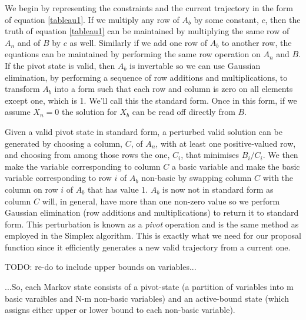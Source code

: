 \documentclass{article}
\begin{document}
We begin by representing the constraints and the current trajectory in the form of equation \ref{tableau1}. If we multiply any row of $A_b$ by some constant, $c$, then the truth of equation \ref{tableau1} can be maintained by multiplying the same row of $A_n$ and of $B$ by $c$ as well. Similarly if we add one row of $A_b$ to another row, the equations can be maintained by performing the same row operation on $A_n$ and $B$. If the pivot state is valid, then $A_b$ is invertable so we can use Gaussian elimination, by performing a sequence of row additions and multiplications, to transform $A_b$ into a form such that each row and column is zero on all elements except one, which is 1. We'll call this the standard form. Once in this form, if we assume $X_n = 0$ the solution for $X_b$ can be read off directly from $B$.

Given a valid pivot state in standard form, a perturbed valid solution can be generated by choosing a column, $C$, of $A_n$, with at least one positive-valued row, and choosing from among those rows the one, $C_i$, that minimises $B_i/C_i$. We then make the variable corresponding to column $C$ a basic variable and make the basic variable corresponding to row $i$ of $A_b$ non-basic by swapping column $C$ with the column on row $i$ of $A_b$ that has value 1. $A_b$ is now not in standard form as column $C$ will, in general, have more than one non-zero value so we perform Gaussian elimination (row additions and multiplications) to return it to standard form. This perturbation is known as a \textit{pivot} operation and is the same method as employed in the Simplex algorithm\cite{dantzig1955generalized}\cite{vanderbei2015linear}. This is exactly what we need for our proposal function since it efficiently generates a new valid trajectory from a current one.

TODO: re-do to include upper bounds on variables...

...So, each Markov state consists of a pivot-state (a partition of variables into m basic varaibles and N-m non-basic variables) and an active-bound state (which assigns either upper or lower bound to each non-basic variable).

\end{document}
